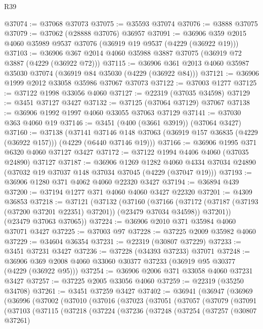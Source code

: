 \begin{lexlean}{R39}
\begin{coremodule}
@37074 := @37068 @37073
@37075 := @35593 @37074
@37076 := @3888 @37075
@37079 := @37062 (@28888 @37076) @36957
@37091 := @36906 @359 @2015 @4060 @35989 @9537 @37076 (@36919 @19 @9537 (@4229 (@36922 @19)))
@37103 := @36906 @367 @2014 @4060 @35988 @3887 @37075 (@36919 @72 @3887 (@4229 (@36922 @72)))
@37115 := @36906 @361 @2013 @4060 @35987 @35030 @37074 (@36919 @84 @35030 (@4229 (@36922 @84)))
@37121 := @36906 @1999 @2012 @33058 @35986 @37067 @37073
@37122 := @37003 @1277
@37125 := @37122 @1998 @33056 @4060
@37127 := @22319 (@37035 @34598)
@37129 := @3451 @37127 @3427
@37132 := @37125 (@37064 @37129) @37067
@37138 := @36906 @1992 @1997 @4060 @33055 @37063 @37129
@37141 := @37030 @363 @4060 @19
@37146 := @3451 (@400 (@3661 @3919)) (@37064 @3427)
@37160 := @37138
    (@37141
      @37146
      @148
      @37063
      (@36919 @157 @36835 (@4229 (@36922 @157)))
      (@4229 (@6440 @37146 @19)))
@37166 := @36906 @1995 @371 @6320 @4060 @37127 @3427
@37172 := @37122 @1994 @4406 @4060 (@37035 @24890) @37127
@37187 := @36906
    @1269
    @1282
    @4060
    @4334
    @37034
    @24890
    (@37032 @19 @37037 @148 @37034 @37045 (@4229 (@37047 @19)))
@37193 := @36906 @1280 @371 @4062 @4060 @22320 @3427
@37194 := @36894 @439
@37200 := @37194 @1277 @371 @4060 @4060 @3427 @22320
@37201 := @4309 @36853
@37218 := @37121
    (@37132
      (@37160
        (@37166
          (@37172 (@37187 (@37193 (@37200 @37201 @22351) @37201)) (@23479 @37034 @34598))
          @37201))
      (@23479 @37063 @37065))
@37224 := @36906 @2010 @371 @35984 @4060 @37071 @3427
@37225 := @37003 @97
@37228 := @37225 @2009 @35982 @4060
@37229 := @34604 @36354
@37231 := @22319 (@30807 @37229)
@37233 := @3451 @37231 @3427
@37236 := @37228 (@34393 @37233) @37071
@37248 := @36906 @369 @2008 @4060 @33060 @30377 @37233 (@36919 @95 @30377 (@4229 (@36922 @95)))
@37254 := @36906 @2006 @371 @33058 @4060 @37231 @3427
@37257 := @37225 @2005 @33056 @4060
@37259 := @22319 (@35250 @34708)
@37261 := @3451 @37259 @3427
@37402 := @36941
    (@36947
      (@36969
        (@36996
          (@37002
            (@37010
              (@37016
                (@37023
                  (@37051
                    (@37057
                      (@37079
                        (@37091
                          (@37103
                            (@37115
                              (@37218
                                (@37224
                                  (@37236
                                    (@37248
                                      (@37254
                                        (@37257
                                          (@30807 @37261)

\end{coremodule}
\end{lexlean}

